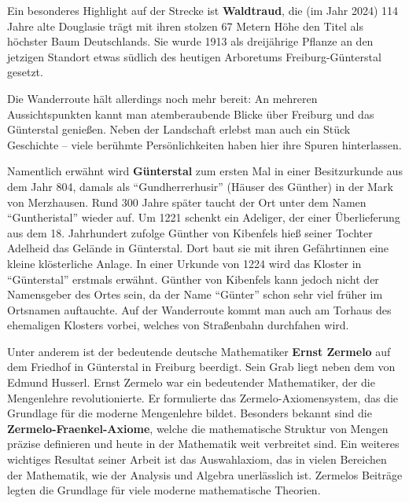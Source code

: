 \documentclass[landscape, a4paper]{article}
\newcommand\alert[1]{\textcolor{PrimaryColor}{\textbf{#1}}}
\begin{document}
\begin{minipage}[t]{0.32\textwidth}
	Ein besonderes Highlight auf der Strecke ist \alert{Waldtraud}, die (im Jahr 2024) 114 Jahre alte Douglasie trägt mit ihren stolzen 67 Metern Höhe den Titel als höchster Baum Deutschlands. Sie wurde 1913 als dreijährige Pflanze an den jetzigen Standort etwas südlich des heutigen Arboretums Freiburg-Günterstal gesetzt.

	Die Wanderroute hält allerdings noch mehr bereit: An mehreren Aussichtspunkten kannt man atemberaubende Blicke über Freiburg und das Günterstal genießen. Neben der Landschaft erlebst man auch ein Stück Geschichte – viele berühmte Persönlichkeiten haben hier ihre Spuren hinterlassen.
\end{minipage}
\hspace{0.4cm}
\begin{minipage}[t]{0.32\textwidth}
	\setlength{\parskip}{0.25cm}

	Namentlich erwähnt wird \alert{Günterstal} zum ersten Mal in einer Besitzurkunde aus dem Jahr 804, damals als \enquote{Gundherrerhusir} (Häuser des Günther) in der Mark von Merzhausen. Rund 300 Jahre später taucht der Ort unter dem Namen \enquote{Guntheristal} wieder auf. Um 1221 schenkt ein Adeliger, der einer Überlieferung aus dem 18. Jahrhundert zufolge Günther von Kibenfels hieß seiner Tochter Adelheid das Gelände in Günterstal. Dort baut sie mit ihren Gefährtinnen eine kleine klösterliche Anlage. In einer Urkunde von 1224 wird das Kloster in \enquote{Günterstal} erstmals erwähnt. Günther von Kibenfels kann jedoch nicht der Namensgeber des Ortes sein, da der Name \enquote{Günter} schon sehr viel früher im Ortsnamen auftauchte. Auf der Wanderroute kommt man auch am Torhaus des ehemaligen Klosters vorbei, welches von Straßenbahn durchfahen wird.

	Unter anderem ist der bedeutende deutsche Mathematiker \alert{Ernst Zermelo} auf dem Friedhof in Günterstal in Freiburg beerdigt. Sein Grab liegt neben dem von Edmund Husserl. Ernst Zermelo war ein bedeutender Mathematiker, der die Mengenlehre revolutionierte. Er formulierte das Zermelo-Axiomensystem, das die Grundlage für die moderne Mengenlehre bildet. Besonders bekannt sind die \alert{Zermelo-Fraenkel-Axiome}, welche die mathematische Struktur von Mengen präzise definieren und heute in der Mathematik weit verbreitet sind. Ein weiteres wichtiges Resultat seiner Arbeit ist das Auswahlaxiom, das in vielen Bereichen der Mathematik, wie der Analysis und Algebra unerlässlich ist. Zermelos Beiträge legten die Grundlage für viele moderne mathematische Theorien.


\end{minipage}
\end{document}
